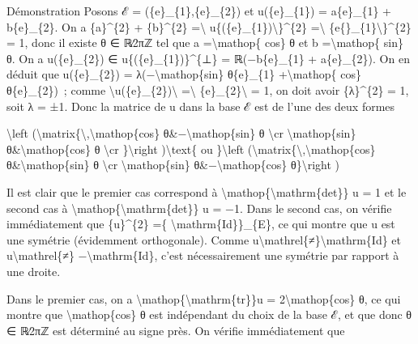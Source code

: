 \documentclass[]{article}
\begin{document}
Démonstration Posons ℰ = (\{e\}\_\{1\},\{e\}\_\{2\}) et u(\{e\}\_\{1\})
= a\{e\}\_\{1\} + b\{e\}\_\{2\}. On a \{a\}\^{}\{2\} + \{b\}\^{}\{2\}
=\textbackslash{}\textbar{}
u\{(\{e\}\_\{1\})\textbackslash{}\textbar{}\}\^{}\{2\}
=\textbackslash{}\textbar{}
\{e\{\}\_\{1\}\textbackslash{}\textbar{}\}\^{}\{2\} = 1, donc il existe
θ ∈ ℝ∕2πℤ tel que a =\textbackslash{}mathop\{ cos\} θ et b
=\textbackslash{}mathop\{ sin\} θ. On a u(\{e\}\_\{2\}) ∈
u\{(\{e\}\_\{1\})\}\^{}\{⊥\} = ℝ(−b\{e\}\_\{1\} + a\{e\}\_\{2\}). On en
déduit que u(\{e\}\_\{2\}) = λ(−\textbackslash{}mathop\{sin\}
θ\{e\}\_\{1\} +\textbackslash{}mathop\{ cos\} θ\{e\}\_\{2\})~; comme
\textbackslash{}\textbar{}u(\{e\}\_\{2\})\textbackslash{}\textbar{}
=\textbackslash{}\textbar{} \{e\}\_\{2\}\textbackslash{}\textbar{} = 1,
on doit avoir \{λ\}\^{}\{2\} = 1, soit λ = ±1. Donc la matrice de u dans
la base ℰ est de l'une des deux formes

\textbackslash{}left
(\textbackslash{}matrix\{\textbackslash{},\textbackslash{}mathop\{cos\}
θ\&−\textbackslash{}mathop\{sin\} θ \textbackslash{}cr
\textbackslash{}mathop\{sin\} θ\&\textbackslash{}mathop\{cos\} θ
\textbackslash{}cr \}\textbackslash{}right )\textbackslash{}text\{ ou
\}\textbackslash{}left
(\textbackslash{}matrix\{\textbackslash{},\textbackslash{}mathop\{cos\}
θ\&\textbackslash{}mathop\{sin\} θ \textbackslash{}cr
\textbackslash{}mathop\{sin\} θ\&−\textbackslash{}mathop\{cos\}
θ\}\textbackslash{}right )

Il est clair que le premier cas correspond à
\textbackslash{}mathop\{\textbackslash{}mathrm\{det\}\} u = 1 et le
second cas à \textbackslash{}mathop\{\textbackslash{}mathrm\{det\}\} u =
−1. Dans le second cas, on vérifie immédiatement que \{u\}\^{}\{2\} =\{
\textbackslash{}mathrm\{Id\}\}\_\{E\}, ce qui montre que u est une
symétrie (évidemment orthogonale). Comme
u\textbackslash{}mathrel\{≠\}\textbackslash{}mathrm\{Id\} et
u\textbackslash{}mathrel\{≠\} −\textbackslash{}mathrm\{Id\}, c'est
nécessairement une symétrie par rapport à une droite.

Dans le premier cas, on a
\textbackslash{}mathop\{\textbackslash{}mathrm\{tr\}\}u =
2\textbackslash{}mathop\{cos\} θ, ce qui montre que
\textbackslash{}mathop\{cos\} θ est indépendant du choix de la base ℰ,
et que donc θ ∈ ℝ∕2πℤ est déterminé au signe près. On vérifie
immédiatement que
\end{document}
